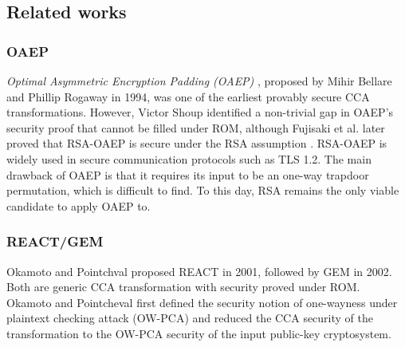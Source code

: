 \documentclass[runningheads]{llncs}
\begin{document}

\subsection{Related works}\label{sec:related-works}
\subsubsection{OAEP}
\textit{Optimal Asymmetric Encryption Padding (OAEP)} \cite{DBLP:conf/eurocrypt/BellareR94}, proposed by Mihir Bellare and Phillip Rogaway in 1994, was one of the earliest provably secure CCA transformations. However, Victor Shoup identified a non-trivial gap in OAEP's security proof that cannot be filled under ROM\cite{DBLP:conf/crypto/Shoup01}, although Fujisaki et al. later proved that RSA-OAEP is secure under the RSA assumption \cite{DBLP:conf/crypto/FujisakiOPS01}. RSA-OAEP is widely used in secure communication protocols such as TLS 1.2. The main drawback of OAEP is that it requires its input to be an one-way trapdoor permutation, which is difficult to find. To this day, RSA remains the only viable candidate to apply OAEP to.

\subsubsection{REACT/GEM} Okamoto and Pointchval proposed REACT \cite{DBLP:conf/ctrsa/OkamotoP01} in 2001, followed by GEM \cite{DBLP:conf/ctrsa/CoronHJPPT02} in 2002. Both are generic CCA transformation with security proved under ROM. Okamoto and Pointcheval first defined the security notion of one-wayness under plaintext checking attack (OW-PCA) and reduced the CCA security of the transformation to the OW-PCA security of the input public-key cryptosystem.
\end{document}
